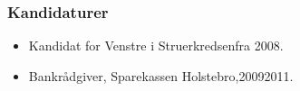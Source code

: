 \documentclass[11pt, a4paper]{awesome-cv}
\begin{document}
\begin{cvletter}
\subsubsection*{Kandidaturer}
\begin{itemize}
\item Kandidat for Venstre i Struerkredsenfra 2008.
\end{itemize}
\begin{itemize}
\item Bankrådgiver, Sparekassen Holstebro,20092011.
\end{itemize}
\end{cvletter}
\end{document}
